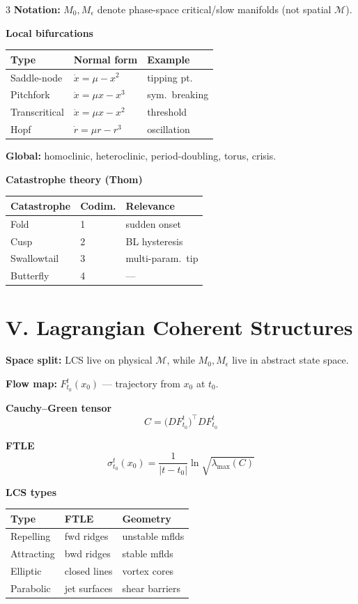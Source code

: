 \documentclass[9pt,letterpaper]{extarticle}
\newcommand{\sect}[1]{\section*{#1}}
\newcommand{\T}[1]{\textbf{#1}}
\begin{document}
\begin{multicols}{3}
\T{Notation:} $M_0,M_\epsilon$ denote phase-space critical/slow manifolds (not spatial $\mathcal{M}$).

\T{Local bifurcations}\\[2pt]
\begin{tabular}{@{}lll@{}}
\toprule
Type & Normal form & Example \\
\midrule
Saddle-node & $\dot x=\mu-x^2$ & tipping pt.\ \\
Pitchfork & $\dot x=\mu x-x^3$ & sym.\ breaking \\
Transcritical & $\dot x=\mu x-x^2$ & threshold \\
Hopf & $\dot r=\mu r-r^3$ & oscillation \\
\bottomrule
\end{tabular}

\T{Global:} homoclinic, heteroclinic, period-doubling, torus, crisis.

\T{Catastrophe theory (Thom)}\\[2pt]
\begin{tabular}{@{}lll@{}}
\toprule
Catastrophe & Codim. & Relevance \\
\midrule
Fold & 1 & sudden onset \\
Cusp & 2 & BL hysteresis \\
Swallowtail & 3 & multi-param.\ tip \\
Butterfly & 4 & --- \\
\bottomrule
\end{tabular}

\sect{V. Lagrangian Coherent Structures}

\T{Space split:} LCS live on physical $\mathcal{M}$, while $M_0,M_\epsilon$ live in abstract state space.

\T{Flow map:} $F_{t_0}^t(x_0)$ — trajectory from $x_0$ at $t_0$.

\T{Cauchy--Green tensor}
\[C = \bigl(DF_{t_0}^t\bigr)^\top DF_{t_0}^t\]

\T{FTLE}
\[\sigma_{t_0}^t(x_0) = \frac{1}{|t-t_0|}\ln\sqrt{\lambda_{\max}(C)}\]

\T{LCS types}\\[2pt]
\begin{tabular}{@{}lll@{}}
\toprule
Type & FTLE & Geometry \\
\midrule
Repelling & fwd ridges & unstable mflds \\
Attracting & bwd ridges & stable mflds \\
Elliptic & closed lines & vortex cores \\
Parabolic & jet surfaces & shear barriers \\
\bottomrule
\end{tabular}


\end{multicols}
\end{document}
